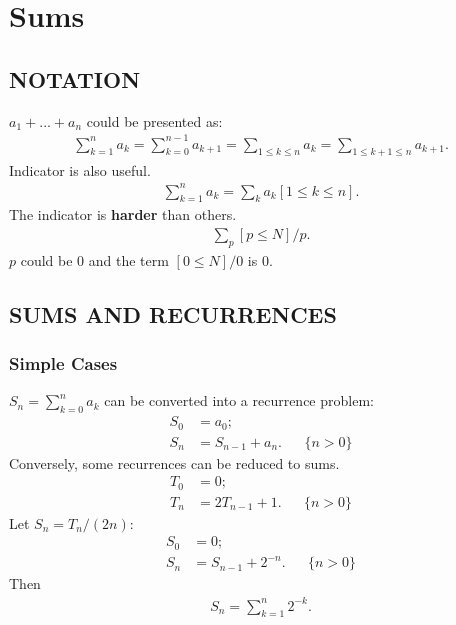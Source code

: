 \documentclass{article}
\begin{document}
\section{Sums}
\subsection{NOTATION}
$a_1 + ... + a_n$ could be presented as:
\begin{align}
\sum_{k=1}^{n}{a_k} = \sum_{k=0}^{n-1}{a_{k+1}} = \sum_{1\le k \le n}{a_k} = \sum_{1\le k+1 \le n}{a_{k+1}}.
\end{align}
Indicator is also useful.
\begin{align}
\sum_{k=1}^{n}{a_k} = \sum_{k}{a_k}[1\le k \le n].
\end{align}
The indicator is \textbf{harder} than others.
\begin{align}
\sum_{p}[p\le N]/p.
\end{align}
$p$ could be $0$ and the term $[0\le N]/0$ is 0.

\subsection{SUMS AND RECURRENCES}
\subsubsection{Simple Cases}
$S_n = \sum_{k=0}^n{a_k}$ can be converted into a recurrence problem:
\begin{align}
S_0 &= a_0;\\
S_n &= S_{n-1} + a_n. && \{n>0\}
\end{align}
Conversely, some recurrences can be reduced to sums.
\begin{align}
T_0 &= 0;\\
T_n &= 2T_{n-1}+1.&& \{n>0\}
\end{align}
Let $S_n =  T_n / (2n)$:
\begin{align}
S_0 &= 0;\\
S_n &= S_{n-1} + 2^{-n}. && \{n>0\}
\end{align}
Then
\begin{align}
S_n = \sum_{k=1}^{n}{2^{-k}}.
\end{align}
\end{document}

